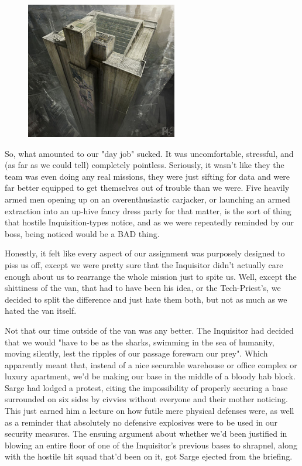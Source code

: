 \begin{figure}
	\begin{center}
		\includegraphics[width=\figwidth]{pics/17/31.png}
	\end{center}
\end{figure}
So, what amounted to our "day job" sucked. 
It was uncomfortable, stressful, and (as far as we could tell) completely pointless. 
Seriously, it wasn't like they the team was even doing any real missions, they were just sifting for data and were far better equipped to get themselves out of trouble than we were. 
Five heavily armed men opening up on an overenthusiastic carjacker, or launching an armed extraction into an up-hive fancy dress party for that matter, is the sort of thing that hostile Inquisition-types notice, and as we were repeatedly reminded by our boss, being noticed would be a BAD thing. 


Honestly, it felt like every aspect of our assignment was purposely designed to piss us off, except we were pretty sure that the Inquisitor didn't actually care enough about us to rearrange the whole mission just to spite us. 
Well, except the shittiness of the van, that had to have been his idea, or the Tech-Priest's, we decided to split the difference and just hate them both, but not as much as we hated the van itself. 


Not that our time outside of the van was any better. 
The Inquisitor had decided that we would "have to be as the sharks, swimming in the sea of humanity, moving silently, lest the ripples of our passage forewarn our prey". 
Which apparently meant that, instead of a nice securable warehouse or office complex or luxury apartment, we'd be making our base in the middle of a bloody hab block. 
Sarge had lodged a protest, citing the impossibility of properly securing a base surrounded on six sides by civvies without everyone and their mother noticing. 
This just earned him a lecture on how futile mere physical defenses were, as well as a reminder that absolutely no defensive explosives were to be used in our security measures. 
The ensuing argument about whether we'd been justified in blowing an entire floor of one of the Inquisitor's previous bases to shrapnel, along with the hostile hit squad that'd been on it, got Sarge ejected from the briefing.

